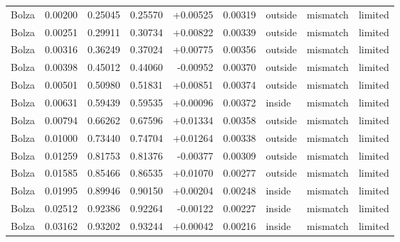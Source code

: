 \begin{longtable}{llrrrrlll}
Bolza & 0.00200 & 0.25045 & 0.25570 & +0.00525 & 0.00319 & outside & mismatch & limited\\
Bolza & 0.00251 & 0.29911 & 0.30734 & +0.00822 & 0.00339 & outside & mismatch & limited\\
Bolza & 0.00316 & 0.36249 & 0.37024 & +0.00775 & 0.00356 & outside & mismatch & limited\\
Bolza & 0.00398 & 0.45012 & 0.44060 & -0.00952 & 0.00370 & outside & mismatch & limited\\
Bolza & 0.00501 & 0.50980 & 0.51831 & +0.00851 & 0.00374 & outside & mismatch & limited\\
Bolza & 0.00631 & 0.59439 & 0.59535 & +0.00096 & 0.00372 & inside & mismatch & limited\\
Bolza & 0.00794 & 0.66262 & 0.67596 & +0.01334 & 0.00358 & outside & mismatch & limited\\
Bolza & 0.01000 & 0.73440 & 0.74704 & +0.01264 & 0.00338 & outside & mismatch & limited\\
Bolza & 0.01259 & 0.81753 & 0.81376 & -0.00377 & 0.00309 & outside & mismatch & limited\\
Bolza & 0.01585 & 0.85466 & 0.86535 & +0.01070 & 0.00277 & outside & mismatch & limited\\
Bolza & 0.01995 & 0.89946 & 0.90150 & +0.00204 & 0.00248 & inside & mismatch & limited\\
Bolza & 0.02512 & 0.92386 & 0.92264 & -0.00122 & 0.00227 & inside & mismatch & limited\\
Bolza & 0.03162 & 0.93202 & 0.93244 & +0.00042 & 0.00216 & inside & mismatch & limited\\
\bottomrule\end{longtable}\normalsize
